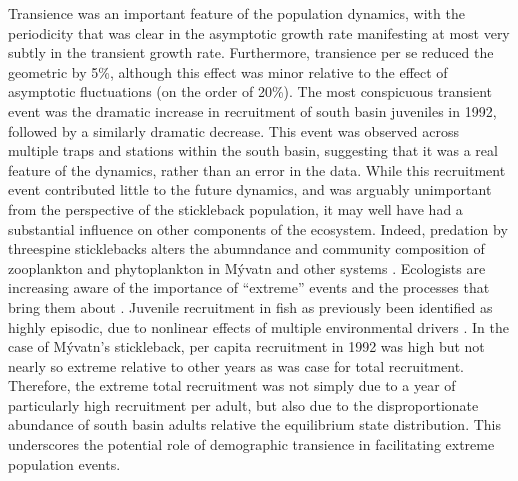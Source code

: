 Transience was an important feature of the population dynamics,
with the periodicity that was clear in the asymptotic growth rate manifesting 
at most very subtly in the transient growth rate.
Furthermore, transience per se reduced the geometric by 5\%,
although this effect was minor relative to the effect of asymptotic fluctuations
(on the order of 20\%). 
The most conspicuous transient event was the dramatic increase in recruitment of south basin juveniles in 1992, followed by a similarly dramatic decrease.
This event was observed across multiple traps and stations within the south basin,
suggesting that it was a real feature of the dynamics, rather than an error in the data.
While this recruitment event contributed little to the future dynamics, and was
arguably unimportant from the perspective of the stickleback population,
it may well have had a substantial influence on other components of the ecosystem.
Indeed, predation by threespine sticklebacks alters the 
abumndance and community composition of 
zooplankton and phytoplankton in M\'{y}vatn \citep{ersoy2017}
and other systems \citep{harmon2009}.
Ecologists are increasing aware of the importance of ``extreme'' events and the 
processes that bring them about \citep{anderson2017, batt2017}.
Juvenile recruitment in fish as previously been identified as highly episodic,
due to nonlinear effects of multiple environmental drivers \citep{dixon1999}.
In the case of M\'{y}vatn's stickleback, 
per capita recruitment in 1992 was high 
but not nearly so extreme relative to other years as was case for total recruitment.
Therefore, the extreme total recruitment was not simply due to a year of particularly
high recruitment per adult, 
but also due to the disproportionate abundance of south basin adults 
relative the equilibrium state distribution.
This underscores the potential role of demographic transience 
in facilitating extreme population events.

